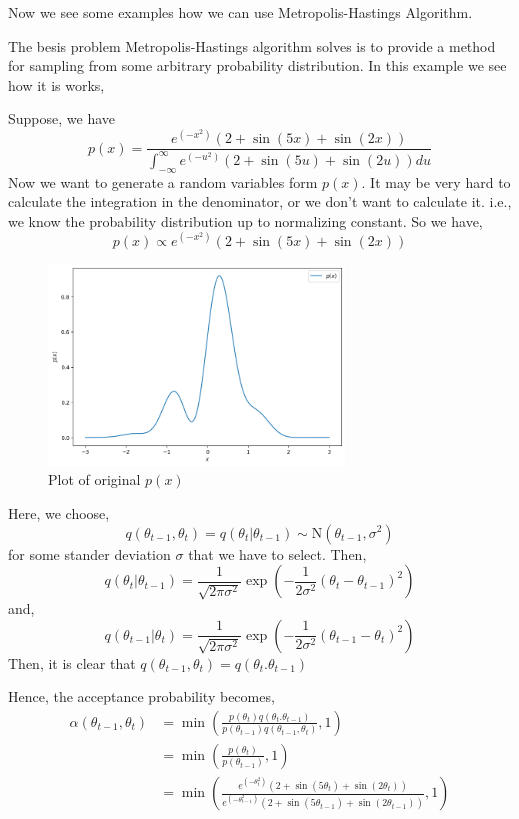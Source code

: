 Now we see some examples how we can use Metropolis-Hastings Algorithm.

\begin{example}
	The besis problem Metropolis-Hastings algorithm solves is to provide a method for sampling from some arbitrary probability distribution. In this example we see how it is works,

	Suppose, we have
	\[
		p(x) = \frac{e^{(-x^2)} \left( 2 + \sin(5x) + \sin(2x) \right) }{ \int_{-\infty}^{\infty} e^{(-u^2)} \left( 2 + \sin(5u) + \sin(2u) \right) du }
	\]
	Now we want to generate a random variables form $ p(x) $. It may be very hard to calculate the integration in the denominator, or we don't want to calculate it. i.e., we know the probability distribution up to normalizing constant.
	So we have,
	\[
		p(x) \propto e^{(-x^2)} \left( 2 + \sin(5x) + \sin(2x) \right)
	\]
	\begin{figure}[H]
		\centering
		\includegraphics[width=0.7\textwidth]{./images/metropolis/example1/plot-of-px.png}
		\caption{Plot of original $p(x)$}
		\label{plot of px}
	\end{figure}

	Here, we choose,
	\[
		q(\theta_{t-1}, \theta_{t}) = q(\theta_t|\theta_{t-1}) \sim \text{N}(\theta_{t-1},\sigma^2)
	\]
	for some stander deviation $ \sigma $ that we have to select.
	Then,
	\[
		q(\theta_{t} | \theta_{t-1}) = \frac{1}{\sqrt{2 \pi \sigma^2}} \exp \left( - \frac{1}{2 \sigma^2} (\theta_t - \theta_{t-1})^2 \right)
	\]
	and,
	\[
		q(\theta_{t-1}|\theta_t) = \frac{1}{\sqrt{2 \pi \sigma^2}} \exp \left( - \frac{1}{2 \sigma^2} (\theta_{t-1} - \theta_{t})^2 \right)
	\]
	Then, it is clear that $ q(\theta_{t-1},\theta_t) = q(\theta_t.\theta_{t-1}) $

	Hence, the acceptance probability becomes,
	\begin{align*}
		\alpha(\theta_{t-1},\theta_{t}) & = \min \left(  \frac{p(\theta_t)q(\theta_t.\theta_{t-1})}{p(\theta_{t-1})q(\theta_{t-1},\theta_t)}  , 1 \right)                                                        \\
		                                & = \min \left( \frac{p(\theta_t)}{p(\theta_{t-1})} , 1 \right)                                                                                                          \\
		                                & = \min \left( \frac{e^{(-\theta_t^2)}(2 + \sin(5 \theta_t) + \sin(2 \theta_t)) }{e^{(-\theta_{t-1}^2)}(2 + \sin(5 \theta_{t-1}) + \sin(2 \theta_{t-1})) }  , 1 \right)
	\end{align*}


\end{example}
